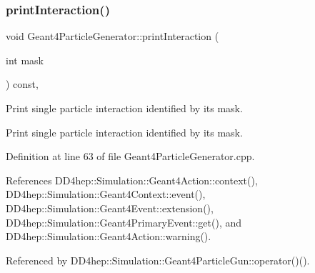 \hypertarget{class_d_d4hep_1_1_simulation_1_1_geant4_particle_generator_aeddc0bbe704e7104915cb1251ee70ad7}{}\label{class_d_d4hep_1_1_simulation_1_1_geant4_particle_generator_aeddc0bbe704e7104915cb1251ee70ad7} 
\subsubsection{\texorpdfstring{print\+Interaction()}{printInteraction()}\hspace{0.1cm}{\footnotesize\ttfamily [1/2]}}
{\footnotesize\ttfamily void Geant4\+Particle\+Generator\+::print\+Interaction (\begin{DoxyParamCaption}\item[{int}]{mask }\end{DoxyParamCaption}) const\hspace{0.3cm}{\ttfamily [protected]}, {\ttfamily [virtual]}}



Print single particle interaction identified by its mask. 

Print single particle interaction identified by it\textquotesingle{}s mask. 

Definition at line 63 of file Geant4\+Particle\+Generator.\+cpp.



References D\+D4hep\+::\+Simulation\+::\+Geant4\+Action\+::context(), D\+D4hep\+::\+Simulation\+::\+Geant4\+Context\+::event(), D\+D4hep\+::\+Simulation\+::\+Geant4\+Event\+::extension(), D\+D4hep\+::\+Simulation\+::\+Geant4\+Primary\+Event\+::get(), and D\+D4hep\+::\+Simulation\+::\+Geant4\+Action\+::warning().



Referenced by D\+D4hep\+::\+Simulation\+::\+Geant4\+Particle\+Gun\+::operator()().

\hypertarget{class_d_d4hep_1_1_simulation_1_1_geant4_particle_generator_a4adbe957bd1c98ca2e739929c4382996}{}\label{class_d_d4hep_1_1_simulation_1_1_geant4_particle_generator_a4adbe957bd1c98ca2e739929c4382996} 
